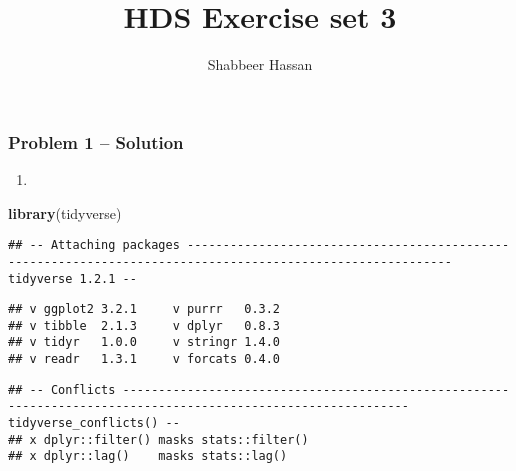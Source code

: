 \documentclass[]{article}
\title{HDS Exercise set 3}
\author{Shabbeer Hassan}
\date{}
\newenvironment{Shaded}{\begin{snugshade}}{\end{snugshade}}
\newcommand{\KeywordTok}[1]{\textcolor[rgb]{0.13,0.29,0.53}{\textbf{#1}}}
\newcommand{\NormalTok}[1]{#1}
\begin{document}
\maketitle

\hypertarget{problem-1-solution}{%
\subsubsection{Problem 1 -- Solution}\label{problem-1-solution}}

\begin{enumerate}
\def\labelenumi{(\alph{enumi})}
\item
\end{enumerate}

\begin{Shaded}
\begin{Highlighting}[]
\KeywordTok{library}\NormalTok{(tidyverse)}
\end{Highlighting}
\end{Shaded}

\begin{verbatim}
## -- Attaching packages ----------------------------------------------------------------------------------------------------------- tidyverse 1.2.1 --
\end{verbatim}

\begin{verbatim}
## v ggplot2 3.2.1     v purrr   0.3.2
## v tibble  2.1.3     v dplyr   0.8.3
## v tidyr   1.0.0     v stringr 1.4.0
## v readr   1.3.1     v forcats 0.4.0
\end{verbatim}

\begin{verbatim}
## -- Conflicts -------------------------------------------------------------------------------------------------------------- tidyverse_conflicts() --
## x dplyr::filter() masks stats::filter()
## x dplyr::lag()    masks stats::lag()
\end{verbatim}
\end{document}
